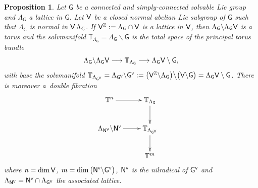 \documentclass[pdftex]{sigma}
\numberwithin{equation}{section}
\newcommand{\Z}{\zed}
\def\V{{\sf V}}
\newcommand{\sfG}{\mathsf{G}}
\newcommand{\sfN}{\mathsf{N}}
\newcommand{\zed}{{\mathbb Z}} %
\newcommand{\torus}{{\mathbb T}} %
\newtheorem{Proposition}[Theorem]{Proposition}
 { \theoremstyle{definition}
\newtheorem{Definition}[Theorem]{Definition}
\newtheorem{Note}[Theorem]{Note}
\newtheorem{Example}[Theorem]{Example}
\newtheorem{Remark}[Theorem]{Remark} }
\begin{document}
\begin{Proposition}\label{prop:doublebundle}
Let $\sfG$ be a connected and simply-connected solvable Lie group and
$\Lambda_\sfG$ a lattice in $\sfG$. Let $\V$ be a closed normal
abelian Lie subgroup of $\sfG$ such that $\Lambda_\sfG$ is normal in $\V\,\Lambda_\sfG$.
If $\V^\zed:=\Lambda_\sfG \cap \V$ is a lattice in $\V$, then
$\Lambda_\sfG\backslash\Lambda_\sfG \V$ is a torus and
the solvmanifold $\torus_{\Lambda_\sfG}=\Lambda_\sfG\backslash\sfG$ is the total space of
the principal torus bundle
\begin{equation*}
\Lambda_\sfG\backslash\Lambda_\sfG
\V\longrightarrow \torus_{\Lambda_\sfG}
\longrightarrow \Lambda_\sfG \V\setminus \sfG ,
\end{equation*}
with base the solvmanifold
$\torus_{\Lambda_{\sfG^{\text{\tiny$\V$}}}}=\Lambda_{\sfG^{\text{\tiny$\V$}}} \backslash
\sfG^{\text{\tiny$\V$}}:=\big(\V^\Z\backslash\Lambda_{\sfG}\big)
 \big\backslash \big(\V\backslash\sfG\big) =
\Lambda_\sfG \V\setminus \sfG$.
There is moreover a~double fibration
\begin{equation}\label{doublefib}\begin{split}&
\xymatrix{\torus^n \ar[r]&
\torus_{\Lambda_\sfG} \ar[d] \\
\Lambda_{\sfN^{\text{\tiny$\V$}}}
\backslash\sfN^{\text{\tiny$\V$}} \ar[r] &
\torus_{\Lambda_{\sfG^{\text{\tiny$\V$}}}} \ar[d] \\
& \torus^m
}\end{split}
\end{equation}
where $n=\dim \V$,
$m=\dim\big(\sfN^{\text{\tiny$\V$}}\backslash\sfG^{\text{\tiny$\V$}}\big)$,
$\sfN^{\text{\tiny$\V$}}$ is the nilradical of
$\sfG^{\text{\tiny$\V$}}$ and
$\Lambda_{\sfN^{\text{\tiny$\V$}}}={\sfN^{\text{\tiny$\V$}}}\cap
\Lambda_{\sfG^{\text{\tiny$\V$}}}$ the associated lattice.
\end{Proposition}
\end{document}
